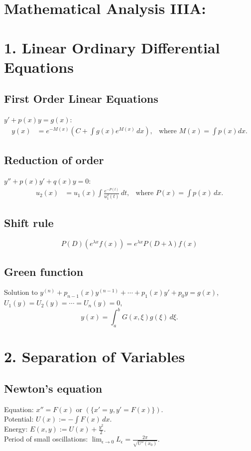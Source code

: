 \section*{Mathematical Analysis IIIA:}


\section*{1. Linear Ordinary Differential Equations}

\subsection*{First Order Linear Equations}
$y'+p(x)y=g(x)$:
\begin{align*}
 y(x) &= e^{-M(x)}\left(C+\int g(x) e^{M(x)}\, dx\right),
 & \text{where } M(x) = \int p(x) dx.
\end{align*}

\subsection*{Reduction of order}
$y'' + p(x)y' + q(x)y=0$:
\begin{align*}
 u_2(x)&= u_1(x) \int \frac{e^{-P(t)}}{u_1^2(t)}\, dt, 
&\text{where } P(x) =  \int p(x)\, dx.
\end{align*}

\subsection*{Shift rule}
\[
    P(D) (e^{\lambda x}f(x)) = e^{\lambda x}P(D+\lambda)f(x)
\]

\subsection*{Green function}
Solution to $y^{(n)} + p_{n-1}(x)y^{(n-1)}+\cdots+p_1(x)y'+p_0y=g(x)$,
$U_1(y)=U_2(y)=\cdots=U_n(y)=0$,
\[
  y(x) = \int_a^b G(x,\xi) g(\xi)\, d\xi.
  \]

\section*{2. Separation of Variables}

\subsection*{Newton's equation}
Equation: $x''=F(x)$ or  $(\{x'=y,y'=F(x)\})$.\\
Potential: $U(x) := -\int F(x)\, dx$.\\
Energy: $E(x,y) := U(x) + \frac {y^2}2$.\\
Period of small oscillations: $\lim_{\epsilon \to 0} L_\epsilon = 
\frac{2\pi}{\sqrt{U''(x_0)}}$.

